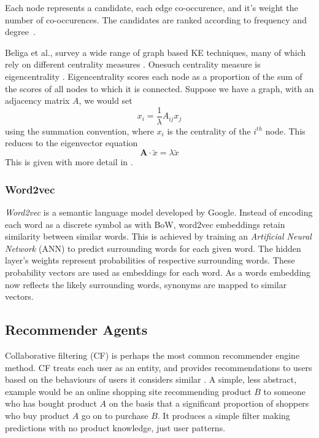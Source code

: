 Each node represents a candidate, each edge co-occurence, and it's weight the number of co-occurences.  The 
candidates are ranked according to frequency and degree~\cite{Rose2010}.

Beliga et al., survey a wide range of graph based KE techniques, many of which rely on different 
centrality measures \cite{Beliga2015}. Onesuch centrality measure is 
eigencentrality \cite{Bonacich2007}. 
Eigencentrality scores each node as a proportion of the sum of the scores of all nodes to which it is connected. 
Suppose we have a graph, with an adjacency matrix $A$, we would set
\begin{equation}
    x_i = \frac{1}{\lambda}A_{ij}x_j
\end{equation}
using the summation convention, where $x_i$ is the centrality of the $i^{th}$ node. This reduces to the eigenvector equation 
\begin{equation}
    \textbf{A}\cdot \utilde{x} = \lambda \utilde{x}
\end{equation} This is given with more detail in \cite{Newman2010}.

\subsubsection{Word2vec}\label{ssec:w2v}
\emph{Word2vec} is a semantic language model developed by Google.  Instead of encoding each word as a discrete symbol
as with BoW, word2vec embeddings retain similarity between similar words. This is achieved by training an \emph{Artificial 
Neural Network} (ANN) to predict surrounding words for each given word.  The hidden layer's weights represent
probabilities of respective surrounding words. These probability vectors are used as embeddings for each word. As a words
embedding now reflects the likely surrounding words, synonyms are mapped to similar vectors.
\cite{Mikolov2013, McCormick2017, Liu2020}

\subsection{Recommender Agents}\label{ssec:recommenders}
Collaborative filtering (CF) is perhaps the most common recommender engine method. CF treats each user as an entity, 
and provides recommendations to users based on the behaviours of users it considers similar 
\cite{Melville2010, Herlocker2000}. A simple, less abstract, example would be an online shopping site recommending
product $B$ to someone who has bought product $A$ on the basis that a significant proportion of shoppers who buy
product $A$ go on to purchase $B$.  It produces a simple filter making predictions with no product knowledge,
just user patterns.

